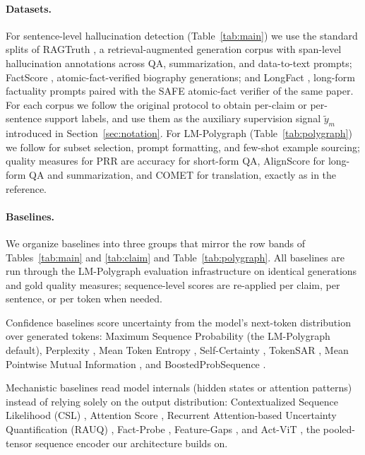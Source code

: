 \paragraph{Datasets.} For sentence-level hallucination detection
(Table~\ref{tab:main}) we use the standard splits of
RAGTruth \citep{niu2024ragtruth}, a retrieval-augmented
generation corpus with span-level hallucination annotations across
QA, summarization, and data-to-text prompts;
FactScore \citep{min2023}, atomic-fact-verified biography
generations; and LongFact \citep{wei2024}, long-form
factuality prompts paired with the SAFE atomic-fact verifier of the
same paper. For each corpus we follow the original protocol to obtain
per-claim or per-sentence support labels, and use them as the
auxiliary supervision signal $\tilde{y}_m$ introduced in
Section~\ref{sec:notation}. For LM-Polygraph (Table~\ref{tab:polygraph})
we follow \citet{vashurin2025lmpolygraph} for subset selection, prompt
formatting, and few-shot example sourcing; quality measures for PRR
are accuracy for short-form QA, AlignScore for long-form QA and
summarization, and COMET for translation, exactly as in the reference.

\paragraph{Baselines.} We organize baselines into three groups that
mirror the row bands of Tables~\ref{tab:main} and \ref{tab:claim} and
Table~\ref{tab:polygraph}. All baselines are run through the
LM-Polygraph evaluation infrastructure
\citep{fadeeva2023lmpolygraph,vashurin2025lmpolygraph} on identical
generations and gold quality measures; sequence-level scores are
re-applied per claim, per sentence, or per token when needed.

Confidence baselines score uncertainty from the model's
next-token distribution over generated tokens:
Maximum Sequence Probability (the LM-Polygraph default),
Perplexity \citep{fomicheva2020unsupervised},
Mean Token Entropy \citep{fomicheva2020unsupervised},
Self-Certainty \citep{kang2025selfcertainty},
TokenSAR \citep{duan2023},
Mean Pointwise Mutual Information \citep{takayama2019pmi},
and BoostedProbSequence \citep{dinh2025boostedprob}.

Mechanistic baselines read model internals (hidden states or
attention patterns) instead of relying solely on the output
distribution: Contextualized Sequence Likelihood (CSL)
\citep{lin2024csl},
Attention Score \citep{sriramanan2024attention},
Recurrent Attention-based Uncertainty Quantification (RAUQ)
\citep{vazhentsev2025rauq},
Fact-Probe \citep{han2025factprobe},
Feature-Gaps \citep{bakman2025featuregaps}, and
Act-ViT \citep{barshalom2025}, the pooled-tensor sequence
encoder our architecture builds on.

